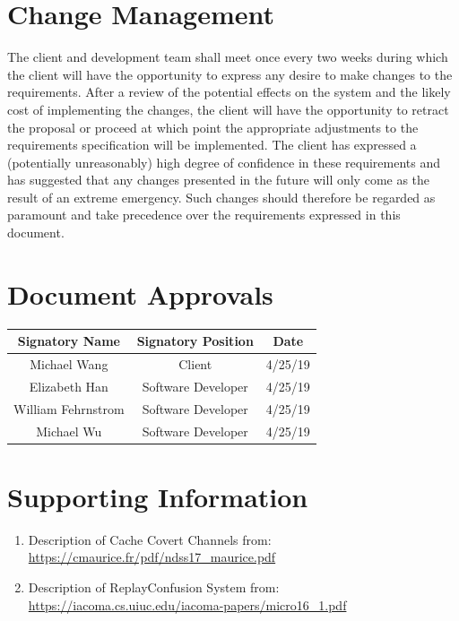 \documentclass[12pt]{article}
\begin{document}
\section{Change Management}

The client and development team shall meet once every two weeks during which the client will have the opportunity
to express any desire to make changes to the requirements. After a review of the potential effects on the system
and the likely cost of implementing the changes, the client will have the opportunity to retract the proposal or
proceed at which point the appropriate adjustments to the requirements specification will be implemented. The client
has expressed a (potentially unreasonably) high degree of confidence in these requirements and has suggested that
any changes presented in the future will only come as the result of an extreme emergency. Such changes should
therefore be regarded as paramount and take precedence over the requirements expressed in this document.

\section{Document Approvals}

\begin{center}
    \begin{tabular}{|c|c|c|}
        \hline
        Signatory Name & Signatory Position & Date \\ \hline
        Michael Wang & Client & 4/25/19 \\ \hline
        Elizabeth Han & Software Developer & 4/25/19 \\ \hline
        William Fehrnstrom & Software Developer & 4/25/19 \\ \hline
        Michael Wu & Software Developer & 4/25/19 \\ \hline
    \end{tabular}
\end{center}

\section{Supporting Information}

\begin{enumerate}
    \item Description of Cache Covert Channels from: \url{https://cmaurice.fr/pdf/ndss17_maurice.pdf}
    \item Description of ReplayConfusion System from: \url{https://iacoma.cs.uiuc.edu/iacoma-papers/micro16_1.pdf}
\end{enumerate}
\end{document}
